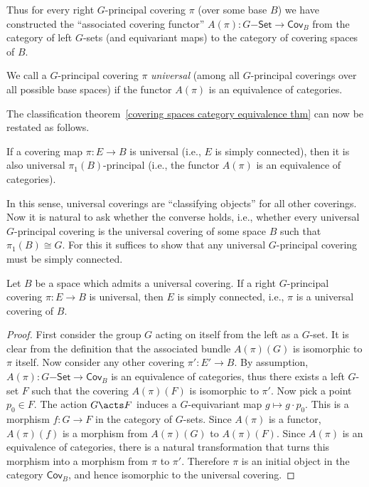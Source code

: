 Thus for every right $G$-principal covering $\pi$ (over some base $B$) we have constructed the ``associated covering functor'' $A(\pi):G\mathsf{-Set}\to \mathsf{Cov}_B$ from the category of left $G$-sets (and equivariant maps) to the category of covering spaces of $B$. 

\begin{defn}
    We call a $G$-principal covering $\pi$ \textit{universal} (among all $G$-principal coverings over all possible base spaces) if the functor $A(\pi)$ is an equivalence of categories.
\end{defn}

The classification theorem~\ref{covering spaces category equivalence thm} can now be restated as follows.
\begin{thm}\label{thm classification of coverings iii}
     If a covering map $\pi:E\to B$ is universal (i.e., $E$ is simply connected), then it is also universal $\pi_1(B)$-principal (i.e., the functor $A(\pi)$ is an equivalence of categories).
\end{thm}

In this sense, universal coverings are ``classifying objects'' for all other coverings. Now it is natural to ask whether the converse holds, i.e., whether every universal $G$-principal covering is the universal covering of some space $B$ such that $\pi_1(B)\cong G$. For this it suffices to show that any universal $G$-principal covering must be simply connected.

\begin{prop}
    Let $B$ be a space which admits a universal covering. If a right $G$-principal covering  $\pi:E\to B$ is universal, then $E$ is simply connected, i.e., $\pi$ is a universal covering of $B$.
\end{prop}
\begin{proof}
    First consider the group $G$ acting on itself from the left as a $G$-set. It is clear from the definition that the associated bundle $A(\pi)(G)$ is isomorphic to $\pi$ itself. Now consider any other covering $\pi':E'\to B$. By assumption, $A(\pi):G\mathsf{-Set}\to \mathsf{Cov}_B$ is an equivalence of categories, thus there exists a left $G$-set $F$ such that the covering $A(\pi)(F)$ is isomorphic to $\pi'$. Now pick a point $p_0\in F$. The action $G\acts F$ induces a $G$-equivariant map $g\mapsto g\cdot p_0$. This is a morphism $f:G\to F$ in the category of $G$-sets. Since $A(\pi)$ is a functor, $A(\pi)(f)$ is a morphism from $A(\pi)(G)$ to $A(\pi)(F)$. Since $A(\pi)$ is an equivalence of categories, there is a natural transformation that turns this morphism into a morphism from $\pi$ to $\pi'$. Therefore $\pi$ is an initial object in the category $\mathsf{Cov}_B$, and hence isomorphic to the universal covering.
\end{proof}

